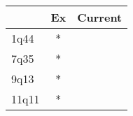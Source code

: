 \begin{tabular}{lcc}
\toprule
{} & Ex & Current \\
\midrule
1q44  &  * &         \\
7q35  &  * &         \\
9q13  &  * &         \\
11q11 &  * &         \\
\bottomrule
\end{tabular}

